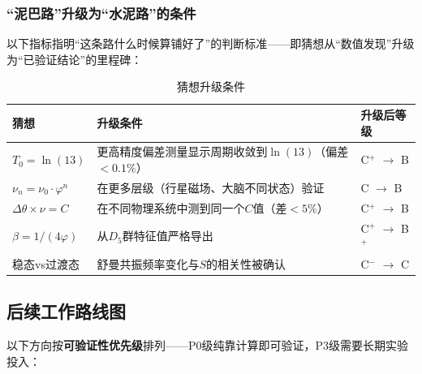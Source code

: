 \documentclass[12pt,a4paper,twocolumn]{article}
\renewcommand{\phi}{\varphi}
\begin{document}
\subsubsection{``泥巴路''升级为``水泥路''的条件}
\label{subsubsec:upgrade_conditions}

以下指标指明``这条路什么时候算铺好了''的判断标准——即猜想从``数值发现''升级为``已验证结论''的里程碑：

\begin{table}[htbp]
\centering
\caption{猜想升级条件}
\label{tab:upgrade_conditions}
\begin{tabular}{lll}
\hline
猜想 & 升级条件 & 升级后等级 \\
\hline
$T_0 = \ln(13)$ & 更高精度偏差测量显示周期收敛到$\ln(13)$（偏差$<0.1\%$） & C$^+$ $\to$ B \\
$\nu_n = \nu_0 \cdot \phi^n$ & 在更多层级（行星磁场、大脑不同状态）验证 & C $\to$ B \\
$\Delta\theta \times \nu = C$ & 在不同物理系统中测到同一个$C$值（差$<5\%$） & C$^+$ $\to$ B \\
$\beta = 1/(4\phi)$ & 从$D_5$群特征值严格导出 & C$^+$ $\to$ B$^+$ \\
稳态vs过渡态 & 舒曼共振频率变化与$S$的相关性被确认 & C$^-$ $\to$ C \\
\hline
\end{tabular}
\end{table}

\subsection{后续工作路线图}
\label{subsec:roadmap}

以下方向按\textbf{可验证性优先级}排列——P0级纯靠计算即可验证，P3级需要长期实验投入：
\end{document}
